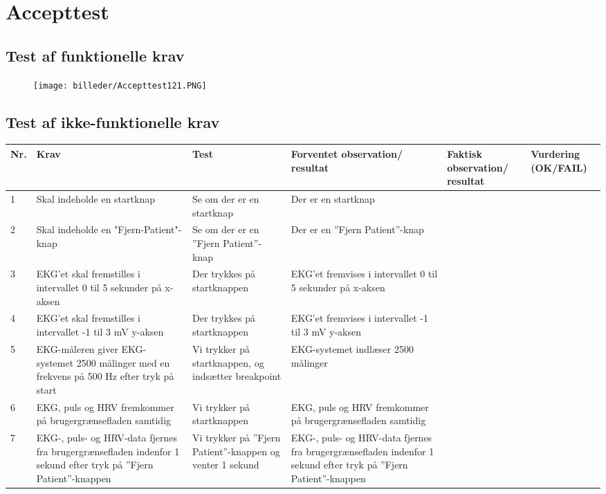 \chapter{Accepttest}

\section{Test af funktionelle krav}

\begin{figure}[H]
\centering
\texttt{[image: billeder/Accepttest121.PNG]}
\end{figure}
\section{Test af ikke-funktionelle krav}
\begin{table}[htbp]
\begin{tabular}{|p{0.5cm}|p{4cm}|p{3cm}|p{3cm}|p{2cm}|p{2cm}|}
\hline
\textbf{Nr.} & \textbf{Krav} & \textbf{Test}& \textbf{Forventet observation/ resultat}& \textbf{Faktisk observation/ resultat}& \textbf{Vurdering (OK/FAIL)}\\\hline
 1 & Skal indeholde en startknap & Se om der er en startknap & Der er en startknap & &\\\hline
 2 & Skal indeholde en "Fjern-Patient"-knap & Se om der er en ”Fjern Patient”-knap & Der er en ”Fjern Patient”-knap & & \\\hline
 3 & EKG’et skal fremstilles i intervallet 0 til 5 sekunder på x-aksen & Der trykkes på startknappen & EKG’et fremvises i intervallet 0 til 5 sekunder på x-aksen & & \\\hline
 4 & EKG’et skal fremstilles i intervallet -1 til 3 mV y-aksen & Der trykkes på startknappen & EKG’et fremvises i intervallet -1 til 3 mV  y-aksen & & \\\hline
 5 & EKG-måleren giver EKG-systemet 2500 målinger med en frekvens på 500 Hz efter tryk på start & Vi trykker på startknappen, og indsætter breakpoint & EKG-systemet indlæser 2500 målinger & & \\\hline
 6 & EKG, puls og HRV fremkommer på brugergrænsefladen samtidig & Vi trykker på startknappen & EKG, puls og HRV fremkommer på brugergrænsefladen samtidig & & \\\hline
 7 & EKG-, puls- og HRV-data fjernes fra brugergrænsefladen indenfor 1 sekund efter tryk på ”Fjern Patient”-knappen & Vi trykker på ”Fjern Patient”-knappen og venter 1 sekund & EKG-, puls- og HRV-data fjernes fra brugergrænsefladen indenfor 1 sekund efter tryk på ”Fjern Patient”-knappen & & \\\hline

\end{tabular}
\end{table}
